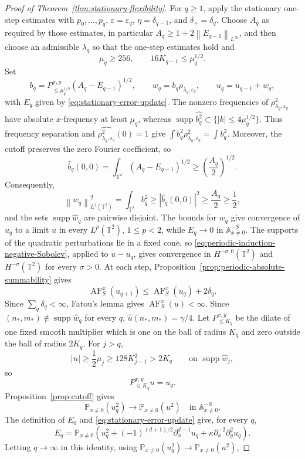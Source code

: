 \documentclass[12pt,reqno,letterpaper]{amsart}
\numberwithin{equation}{section}
\theoremstyle{definition}
\newcommand{\T}{\mathbb T}
\newcommand{\A}{\mathbb A}
\newcommand{\eps}{\varepsilon}
\newcommand{\la}{\lambda}
\newcommand{\supp}{\operatorname{supp}}
\newcommand{\norm}[1]{\left\lVert #1\right\rVert}
\newcommand{\abs}[1]{\left\lvert #1\right\rvert}
\begin{document}
\begin{proof}[Proof of Theorem~\ref{thm:stationary-flexibility}]
For $q\geq1$, apply the stationary one-step estimates with
$p_0,\ldots,p_q$, $\eps=\eps_q$, $\eta=\delta_{q-1}$, and
$\delta_+=\delta_q$.  Choose $A_q$ as required by those estimates, in
particular $A_q\geq1+2\norm{E_{q-1}}_{L^\infty}$, and then choose an
admissible $\la_q$ so that the one-step estimates hold and
\[
 \mu_q\geq256,\qquad 16K_{q-1}\leq\mu_q^{1/2}.
\]
Set
\[
 b_q=P_{\leq\mu_q^{1/2}}^{x,y}(A_q-E_{q-1})^{1/2},
 \qquad w_q=b_q\rho_{\la_q,\eps_q},
 \qquad u_q=u_{q-1}+w_q,
\]
with $E_q$ given by \eqref{eq:stationary-error-update}.
The nonzero frequencies of $\rho_{\la_q,\eps_q}^2$ have absolute
$x$-frequency at least $\mu_q$, whereas
$\supp\widehat{b_q^2}\subset\{\abs k\leq4\mu_q^{1/2}\}$.
Thus frequency separation and
$\widehat{\rho_{\la_q,\eps_q}^2}(0)=1$ give
$\int b_q^2\rho_{\la_q,\eps_q}^2=\int b_q^2$.
Moreover, the cutoff preserves the zero Fourier coefficient, so
\[
 \widehat b_q(0,0)=\int_{\T^2}(A_q-E_{q-1})^{1/2}
 \geq\left(\frac{A_q}{2}\right)^{1/2}.
\]
Consequently,
\[
 \norm{w_q}_{L^2(\T^2)}^2
 =\int_{\T^2}b_q^2
 \geq\abs{\widehat b_q(0,0)}^2
 \geq\frac{A_q}{2}\geq\frac12,
\]
and the sets $\supp\widehat w_q$ are pairwise disjoint.
The bounds for $w_q$ give convergence
of $u_q$ to a limit $u$ in every $L^p(\T^2)$, $1\leq p<2$, while
$E_q\to0$ in $\A^{-S}_{x\neq0}$.  The supports of the quadratic
perturbations lie in a fixed cone, so
\eqref{eq:periodic-induction-negative-Sobolev}, applied to $u-u_q$, gives
convergence in $H^{-\sigma,0}(\T^2)$ and
$H^{-\sigma}(\T^2)$ for every $\sigma>0$.  At each step,
Proposition~\ref{prop:periodic-absolute-summability} gives
\[
 \operatorname{AF}_S^x(u_{q+1})
 \leq\operatorname{AF}_S^x(u_q)+2\delta_q.
\]
Since $\sum_q\delta_q<\infty$, Fatou's lemma gives
$\operatorname{AF}_S^x(u)<\infty$.  Since
$(n_*,m_*)\notin\supp\widehat w_q$ for every $q$,
$\widehat u(n_*,m_*)=\gamma/4$.  Let $P_{\leq K_q}^{x,y}$ be the dilate
of one fixed smooth multiplier which is one on the ball of radius $K_q$
and zero outside the ball of radius $2K_q$.  For $j>q$,
\[
 \abs n\geq\frac12\mu_j\geq128K_{j-1}^2>2K_q
 \qquad\text{on }\supp\widehat w_j,
\]
so
\[
 P_{\leq K_q}^{x,y}u=u_q.
\]
Proposition~\ref{prop:cutoff} gives
\[
 \mathbb P_{x\neq0}(u_q^2)
 \longrightarrow\mathbb P_{x\neq0}(u^2)
 \quad\text{in }\A^{-S}_{x\neq0}.
\]
The definition of $E_0$ and \eqref{eq:stationary-error-update} give, for
every $q$,
\[
 E_q=\mathbb P_{x\neq0}\left(
 u_q^2+(-1)^{(d+1)/2}\partial_x^{d-1}u_q
 +\kappa\partial_x^{-2}\partial_y^2u_q\right).
\]
Letting $q\to\infty$ in this identity, using
$\mathbb P_{x\neq0}(u_q^2)\to\mathbb P_{x\neq0}(u^2)$,

\end{proof}
\end{document}
